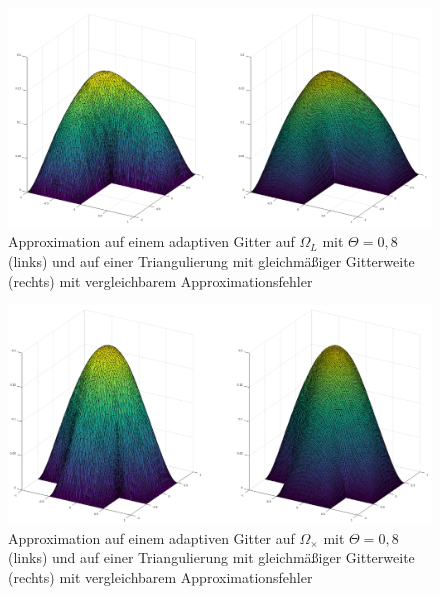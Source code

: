 \begin{figure}[!htbp]
	\begin{center}
		\includegraphics[width=15cm]{pics/approx.PNG}
	\end{center}
	\caption{\label{app} Approximation auf einem adaptiven Gitter auf $\Omega_L$ mit $\Theta = 0,8$ (links) und auf einer Triangulierung mit gleichmäßiger Gitterweite (rechts) mit vergleichbarem Approximationsfehler}
\end{figure}
\begin{figure}[!htbp]
	\begin{center}
		\includegraphics[width=15cm]{pics/approx2.PNG}
	\end{center}
	\caption{\label{app2} Approximation auf einem adaptiven Gitter auf $\Omega_\times$ mit $\Theta = 0,8$ (links) und auf einer Triangulierung mit gleichmäßiger Gitterweite (rechts) mit vergleichbarem Approximationsfehler}
\end{figure}
